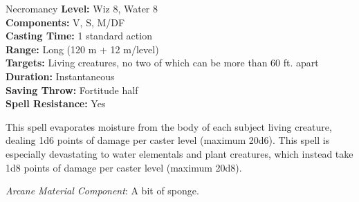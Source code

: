 {Necromancy}
{
	\textbf{Level:}
	Wiz 8, Water 8\\
	\textbf{Components:}
	V, S, M/DF\\
	\textbf{Casting Time:}
	1 standard action\\
	\textbf{Range:}
	Long (120 m + 12 m/level)\\
	\textbf{Targets:}
	Living creatures, no two of which can be more than 60 ft. apart\\
	\textbf{Duration:}
	Instantaneous\\
	\textbf{Saving Throw:}
	Fortitude half\\
	\textbf{Spell Resistance:}
	Yes\\
}
{
	This spell evaporates moisture from the body of each subject living creature, dealing 1d6 points of damage per caster level (maximum 20d6). This spell is especially devastating to water elementals and plant creatures, which instead take 1d8 points of damage per caster level (maximum 20d8).

	\textit{Arcane Material Component}:
	A bit of sponge.

}
